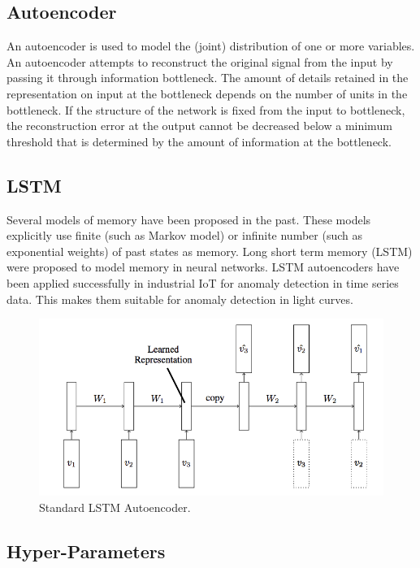 \documentclass[%
aip,
amsmath,amssymb,
reprint,%
]{revtex4-1}
\begin{document}
\subsection{Autoencoder}

An autoencoder is used to model the (joint) distribution of one or more variables. An autoencoder attempts to reconstruct the original signal from the input by passing it through information bottleneck. The amount of details retained in the representation on input at the bottleneck depends on the number of units in the bottleneck. If the structure of the network is fixed from the input to bottleneck, the reconstruction error at the output cannot be decreased below a minimum threshold that is determined by the amount of information at the bottleneck.

\subsection{LSTM}

Several models of memory have been proposed in the past. These models explicitly use finite (such as Markov model) or infinite number (such as exponential weights) of past states as memory. Long short term memory (LSTM) were proposed to model memory in neural networks. LSTM autoencoders have been applied successfully in industrial IoT for anomaly detection in time series data. This makes them suitable for anomaly detection in light curves.

\begin{figure}[h!]
	\includegraphics[width=\linewidth]{LSTM-Autoencoder-Model.png}
	\caption{Standard LSTM Autoencoder.}
	\label{fig:lstm_autoenc}
\end{figure}

\subsection{Hyper-Parameters}
\end{document}
